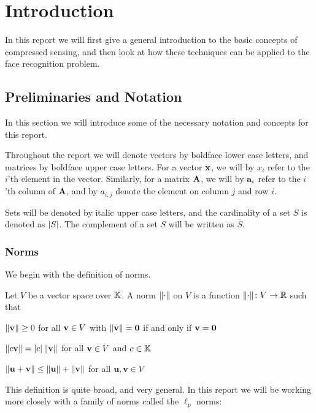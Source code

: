 \chapter{Introduction}

In this report we will first give a general introduction to the basic concepts of compressed sensing, and then look at how these techniques can be applied to the face recognition problem. 


\section{Preliminaries and Notation}
In this section we will introduce some of the necessary notation and concepts for this report. 

Throughout the report we will denote vectors by boldface lower case letters, and matrices by boldface upper case letters. For a vector $ \mathbf{x} $, we will by $ x_{i} $ refer to the $ i $'th element in the vector. Similarly, for a matrix $ \mathbf{A} $, we will by $ \mathbf{a}_{i} $ refer to the $ i $'th  column of $ \mathbf{A} $, and by $ a_{i, j} $ denote the element on  column $ j $ and row $ i $.

Sets will be denoted by italic upper case letters, and the cardinality of a set $ S $ is denoted as $ \left|S\right| $. The complement of a set $ S $ will be written as $ \overline{S} $. 

\subsection{Norms}
We begin with the definition of norms. 

\begin{definition} \label{def:norm}
	Let $ V $ be a vector space over $ \mathbb{K} $.  A norm $ \lVert\cdot\rVert $ on $ V $ is a function $ \lVert\cdot\rVert\colon V \to\mathbb{R} $ such that
	\begin{subdef}
		\item $ \lVert\mathbf{v}\rVert \geq 0 $ for all $ \mathbf{v} \in V $ with $ \lVert\mathbf{v}\rVert = \mathbf{0} $ if and only if $ \mathbf{v} = \mathbf{0} $
		\item $ \lVert c\mathbf{v}\rVert = \left|c\right|\lVert\mathbf{v}\rVert $ for all $ \mathbf{v} \in V $ and $ c \in \mathbb{K} $
		\item $ \lVert\mathbf{u} + \mathbf{v}\rVert \leq \lVert\mathbf{u}\rVert + \lVert\mathbf{v}\rVert $ for all $ \mathbf{u},  \mathbf{v} \in V $
	\end{subdef}
\end{definition}

This definition is quite broad, and very general. In this report we will be working more closely with a family of norms called the $ \ell_{p} $ norms:

